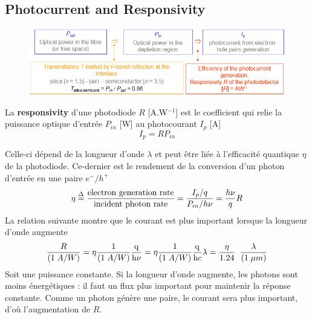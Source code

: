 \subsection{Photocurrent and Responsivity}
\begin{figure}
\vspace{-5mm}
\includegraphics[scale=0.45]{ch5/image2}
\end{figure}
La \textbf{responsivity} d'une photodiode $R$ [A.W$^{-1}$] est le coefficient qui relie la 
puissance optique d'entrée $P_{in}$ [W] au photocourant $I_p$ [A]
\begin{equation}
{I_p} = R{P_{in}}
\end{equation}
 
\newpage
Celle-ci dépend de la longueur d'onde $\lambda$ et peut être liée à l'efficacité quantique $\eta$
de la photodiode. Ce-dernier est le rendement de la conversion d'un photon d'entrée en une paire
$e^-/h^+$
\begin{equation}
\eta  \buildrel \Delta \over = \frac{{\text{electron generation rate}}}{{\text{incident photon rate}}} = \frac{{{{{I_p}} \mathord{\left/
 {\vphantom {{{I_p}} q}} \right.
 \kern-\nulldelimiterspace} q}}}{{{{{P_{in}}} \mathord{\left/
 {\vphantom {{{P_{in}}} {h\nu }}} \right.
 \kern-\nulldelimiterspace} {h\nu }}}} = \frac{{h\nu }}{q}R
\end{equation}
La relation suivante montre que le courant est plus important lorsque la longueur d'onde augmente
\begin{equation}
\frac{R}{{(1\;A/W)}} = \eta \frac{1}{{(1\;A/W)}}\frac{{\rm{q}}}{{{\rm{h}}\nu }} = \eta \frac{1}{{(1\;A/W)}}\frac{{\rm{q}}}{{{\rm{h}}c}}\lambda  = \frac{\eta }{{1.24}}\;\;\frac{\lambda }{{(1\;\mu m)}}
\end{equation}
Soit une puissance constante. Si la longueur d'onde augmente, les photons sont moins énergétiques :
il faut un flux plus important pour maintenir la réponse constante. Comme un photon génère une paire, 
le courant sera plus important, d'où l'augmentation de $R$.

